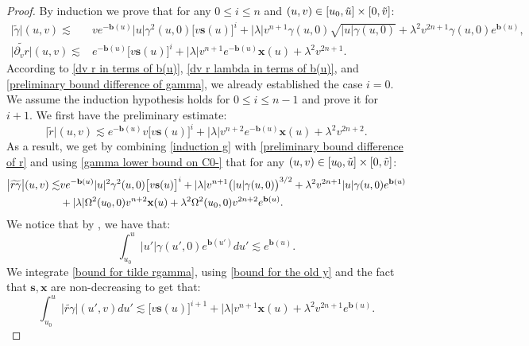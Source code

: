 \documentclass[11pt]{article}
\numberwithin{equation}{section}
\begin{document}
\begin{proof}
    By induction we prove that for any $0\leq i\leq n$ and $(u,v)\in[u_0,\Tilde{u}]\times[0,\Tilde{v}]$:
    \begin{align}
        \big|\widetilde{\gamma}\big|(u,v)\lesssim & ve^{-\mathbf{b}(u)}|u|\gamma^2(u,0)\big[v\mathbf{s}(u)\big]^{i}+|\lambda|v^{n+1}\gamma(u,0)\sqrt{|u|\gamma(u,0)}+\lambda^2v^{2n+1}\gamma(u,0)e^{\mathbf{b}(u)},\label{induction g}\\
        \big|\widetilde{\partial_vr}\big|(u,v)\lesssim & e^{-\mathbf{b}(u)}\big[v\mathbf{s}(u)\big]^{i}+|\lambda|v^{n+1}e^{-\mathbf{b}(u)}\mathbf{x}(u)+\lambda^2v^{2n+1}.\label{induction r}
    \end{align}
    According to \eqref{dv r in terms of b(u)}, \eqref{dv r lambda in terms of b(u)}, and \eqref{preliminary bound difference of gamma}, we already established the case $i=0$. We assume the induction hypothesis holds for $0\leq i\leq n-1$ and prove it for $i+1.$ We first have the preliminary estimate:
    \begin{equation}\label{preliminary bound difference of r}
        \big|\widetilde{r}\big|(u,v)\lesssim e^{-\mathbf{b}(u)}v\big[v\mathbf{s}(u)\big]^{i}+|\lambda| v^{n+2}e^{-\mathbf{b}(u)}\mathbf{x}(u)+\lambda^2v^{2n+2}.
    \end{equation}
    As a result, we get by combining \eqref{induction g} with \eqref{preliminary bound difference of r} and using \eqref{gamma lower bound on C0-} that for any $(u,v)\in[u_0,\Tilde{u}]\times[0,\Tilde{v}]$:
    \begin{align}\label{bound for tilde rgamma}
        \big|\widetilde{r\gamma}\big|(u,v)\lesssim & ve^{-\mathbf{b}(u)}|u|^2\gamma^2(u,0)\big[v\mathbf{s}(u)\big]^{i}+|\lambda| v^{n+1}\big(|u|\gamma(u,0)\big)^{3/2}+\lambda^2v^{2n+1}|u|\gamma(u,0)e^{\mathbf{b}(u)}\\
        & +|\lambda|\Omega^2(u_0,0) v^{n+2}\mathbf{x}(u)+\lambda^2\Omega^2(u_0,0)v^{2n+2}e^{\mathbf{b}(u)}.\notag
    \end{align}
    We notice that by , we have that:
    \begin{equation}\label{bound for the old y}
        \int_{u_0}^u|u'|\gamma(u',0)e^{\mathbf{b}(u')}du'\lesssim e^{\mathbf{b}(u)}.
    \end{equation}
    We integrate \eqref{bound for tilde rgamma}, using \eqref{bound for the old y} and the fact that $\mathbf{s},\mathbf{x}$ are non-decreasing to get that:
    \begin{equation}\label{preliminary bound difference of r gamma}
        \int_{u_0}^u\big|\widetilde{r\gamma}\big|(u',v)du'\lesssim \big[v\mathbf{s}(u)\big]^{i+1}+|\lambda| v^{n+1}\mathbf{x}(u)+\lambda^2v^{2n+1}e^{\mathbf{b}(u)}.

\end{equation}
\end{proof}
\end{document}
